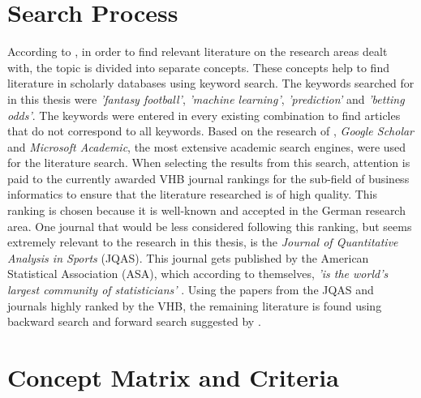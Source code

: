 \clearpage \section{Search Process}
According to \citet{vom_brocke_standing_2015}, in order to find relevant literature on the research areas dealt with, the topic is divided into separate concepts. These concepts help to find literature in scholarly databases using keyword search. The keywords searched for in this thesis were \emph{'fantasy football'}, \emph{'machine learning'}, \emph{'prediction'} and \emph{'betting odds'}. The keywords were entered in every existing combination to find articles that do not correspond to all keywords. Based on the research of \citet{gusenbauer_google_2019}, \emph{Google Scholar} and \emph{Microsoft Academic}, the most extensive academic search engines, were used for the literature search. When selecting the results from this search, attention is paid to the currently awarded VHB journal rankings \parencite[see][]{vhb_e_v_vhb-jourqual3_2015} for the sub-field of business informatics to ensure that the literature researched is of high quality. This ranking is chosen because it is well-known and accepted in the German research area. One journal that would be less considered following this ranking, but seems extremely relevant to the research in this thesis, is the \emph{Journal of Quantitative Analysis in Sports} (JQAS). This journal gets published by the American Statistical Association (ASA), which according to themselves, \emph{'is the world's largest community of statisticians'} \parencite[see][]{noauthor_about_nodate}. Using the papers from the JQAS and journals highly ranked by the VHB, the remaining literature is found using backward search and forward search suggested by \citet{webster_guest_2002}.

\section{Concept Matrix and Criteria}

